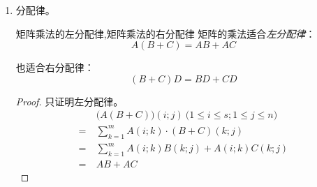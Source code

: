 \begin{enumerate}
	即，从 $AB = 0$ 不同推出 $A = 0$ 或 $B = 0$。见下例：
	$$
	\begin{bmatrix} 0 & 0 \\ 0 & 1 \end{bmatrix}
	\begin{bmatrix} 0 & 1 \\ 0 & 0 \end{bmatrix}
	=
	\begin{bmatrix} 0 & 0 \\ 0 & 0 \end{bmatrix}
	$$

	不过，我们可以提出以下概念。

	\begin{definition}{左零因子}
		对于矩阵 $A$，如果存在一个矩阵 $B \ne 0$ 使得 $AB = 0$，那么称 $A$ 是一个\emph{左零因子}。
	\end{definition}

	\begin{definition}{右零因子}
		对于矩阵 $A$，如果存在一个矩阵 $C \ne 0$ 使得 $CA = 0$，那么称 $A$ 是一个\emph{右零因子}。
	\end{definition}

	\begin{definition}{零因子}
		左零因子和右零因子统称为\emph{零因子}。
	\end{definition}

	\begin{definition}{平凡的零因子}
		显然，零矩阵是零因子，称它为\emph{平凡的零因子}。
	\end{definition}

	\item 分配律。

	\begin{theorem}{矩阵乘法的左分配律,矩阵乘法的右分配律}
		矩阵的乘法适合\emph{左分配律}：
		$$
		A (B + C) = AB + AC
		$$

		也适合右分配律：
		$$
		(B + C) D = BD + CD
		$$
	\end{theorem}

	\begin{proof}
		只证明左分配律。
		$$
		\begin{aligned}&
			\bigl( A(B + C) \bigr)(i; j) \pod{1 \le i \le s; 1 \le j \le n}
			\\=~&
			\sum\limits_{k = 1}^m A(i; k) \cdot (B + C)(k; j)
			\\=~&
			\sum\limits_{k = 1}^m A(i; k) B(k; j) + A(i; k) C(k; j)
			\\=~&
			AB + AC
		\end{aligned}
		$$
	\end{proof}


\end{enumerate}
